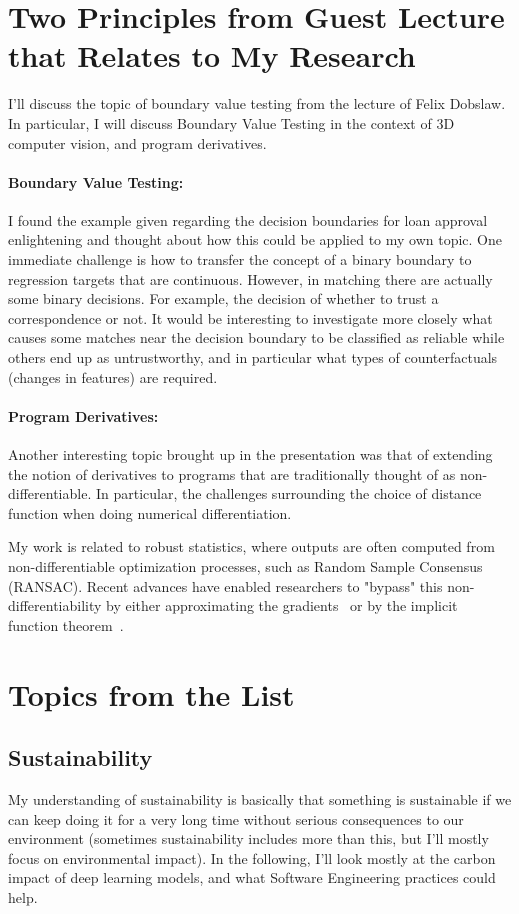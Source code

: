 \documentclass[11pt]{article}
\begin{document}
\section{Two Principles from Guest Lecture that Relates to My Research}
I'll discuss the topic of boundary value testing from the lecture of Felix Dobslaw. In particular, I will discuss Boundary Value Testing in the context of 3D computer vision, and program derivatives.
\paragraph{Boundary Value Testing:}
I found the example given regarding the decision boundaries for loan approval enlightening and thought about how this could be applied to my own topic. One immediate challenge is how to transfer the concept of a binary boundary to regression targets that are continuous. However, in matching there are actually some binary decisions. For example, the decision of whether to trust a correspondence or not. It would be interesting to investigate more closely what causes some matches near the decision boundary to be classified as reliable while others end up as untrustworthy, and in particular what types of counterfactuals (changes in features) are required.
\paragraph{Program Derivatives:}
Another interesting topic brought up in the presentation was that of extending the notion of derivatives to programs that are traditionally thought of as non-differentiable. In particular, the challenges surrounding the choice of distance function when doing numerical differentiation.

My work is related to robust statistics, where outputs are often computed from non-differentiable optimization processes, such as Random Sample Consensus (RANSAC). Recent advances have enabled researchers to "bypass" this non-differentiability by either approximating the gradients~\cite{brachmann2017dsac} or by the implicit function theorem~\cite{gould2021deep}. 

\section{Topics from the List}

\subsection{Sustainability}
My understanding of sustainability is basically that something is sustainable if we can keep doing it for a very long time without serious consequences to our environment (sometimes sustainability includes more than this, but I'll mostly focus on environmental impact). In the following, I'll look mostly at the carbon impact of deep learning models, and what Software Engineering practices could help.
\end{document}
